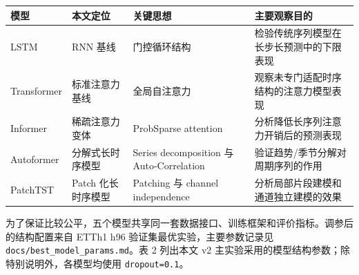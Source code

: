 {\def\LTcaptype{none} %
\begin{longtable}[]{@{}
  >{\raggedright\arraybackslash}p{}
  >{\raggedright\arraybackslash}p{}
  >{\raggedright\arraybackslash}p{}
  >{\raggedright\arraybackslash}p{}@{}}
\toprule\noalign{}
\begin{minipage}[b]{\linewidth}\raggedright
模型
\end{minipage} & \begin{minipage}[b]{\linewidth}\raggedright
本文定位
\end{minipage} & \begin{minipage}[b]{\linewidth}\raggedright
关键思想
\end{minipage} & \begin{minipage}[b]{\linewidth}\raggedright
主要观察目的
\end{minipage} \\
\midrule\noalign{}
\endhead
\bottomrule\noalign{}
\endlastfoot
LSTM & RNN 基线 & 门控循环结构 & 检验传统序列模型在长步长预测中的下限表现 \\
Transformer & 标准注意力基线 & 全局自注意力 & 观察未专门适配时序结构的注意力模型表现 \\
Informer & 稀疏注意力变体 & ProbSparse attention & 分析降低长序列注意力开销后的预测表现 \\
Autoformer & 分解式长时序模型 & Series decomposition 与 Auto-Correlation & 验证趋势/季节分解对周期序列的作用 \\
PatchTST & Patch 化长时序模型 & Patching 与 channel independence & 分析局部片段建模和通道独立建模的效果 \\
\end{longtable}
}

为了保证比较公平，五个模型共享同一套数据接口、训练框架和评价指标。调参后的结构配置来自 ETTh1 h96 验证集最优实验，主要参数记录见 \texttt{docs/best\_model\_params.md}。表 2 列出本文 v2 主实验采用的模型结构参数；除特别说明外，各模型均使用 \texttt{dropout=0.1}。

